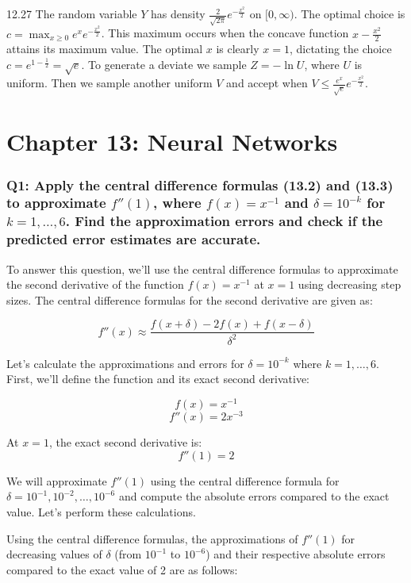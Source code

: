 \documentclass[8pt]{article}
\begin{document}
12.27 The random variable \(Y\) has density \(\frac{2}{\sqrt{2\pi}} e^{-\frac{x^2}{2}}\) on \([0, \infty)\). The optimal choice is \(c = \max_{x \geq 0} e^x e^{-\frac{x^2}{2}}\). This maximum occurs when the concave function \(x - \frac{x^2}{2}\) attains its maximum value. The optimal \(x\) is clearly \(x = 1\), dictating the choice \(c = e^{1 - \frac{1}{2}} = \sqrt{e}\). To generate a deviate we sample \(Z = -\ln U\), where \(U\) is uniform. Then we sample another uniform \(V\) and accept when \(V \leq \frac{e^x}{\sqrt{e}} e^{-\frac{x^2}{2}}\).

\newpage
\section*{Chapter 13: Neural Networks}

\subsubsection*{Q1: Apply the central difference formulas (13.2) and (13.3) to approximate \( f''(1) \), where \( f(x) = x^{-1} \) and \(\delta = 10^{-k}\) for \( k = 1, \ldots, 6 \). Find the approximation errors and check if the predicted error estimates are accurate.}

To answer this question, we'll use the central difference formulas to approximate the second derivative of the function \( f(x) = x^{-1} \) at \( x = 1 \) using decreasing step sizes. The central difference formulas for the second derivative are given as:

\[ f''(x) \approx \frac{f(x+\delta) - 2f(x) + f(x-\delta)}{\delta^2} \]

Let's calculate the approximations and errors for \( \delta = 10^{-k} \) where \( k = 1, \ldots, 6 \). First, we'll define the function and its exact second derivative:

\[ f(x) = x^{-1} \]
\[ f''(x) = 2x^{-3} \]

At \( x = 1 \), the exact second derivative is:
\[ f''(1) = 2 \]

We will approximate \( f''(1) \) using the central difference formula for \( \delta = 10^{-1}, 10^{-2}, \ldots, 10^{-6} \) and compute the absolute errors compared to the exact value. Let's perform these calculations.

Using the central difference formulas, the approximations of \( f''(1) \) for decreasing values of \( \delta \) (from \( 10^{-1} \) to \( 10^{-6} \)) and their respective absolute errors compared to the exact value of 2 are as follows:
\end{document}
